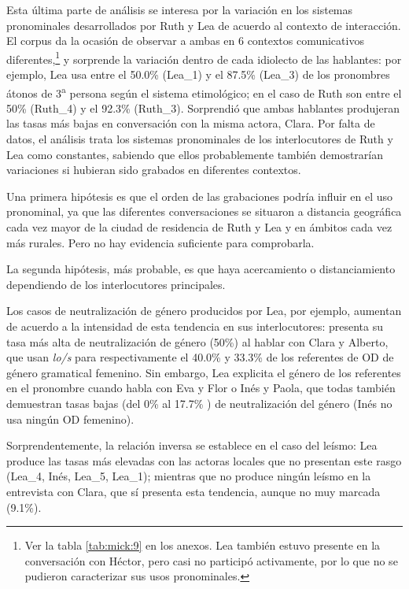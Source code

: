 \documentclass[output=paper]{../langscibook}
\begin{document}
Esta última parte de análisis se interesa por la variación en los sistemas pronominales desarrollados por Ruth y Lea de acuerdo al contexto de interacción. El corpus da la ocasión de observar a ambas en 6 contextos comunicativos diferentes,\footnote{Ver la tabla \ref{tab:mick:9} en los anexos. Lea también estuvo presente en la conversación con Héctor, pero casi no participó activamente, por lo que no se pudieron caracterizar sus usos pronominales.} y sorprende la variación dentro de cada idiolecto de las hablantes: por ejemplo, Lea usa entre el 50.0\% (Lea\_1) y el 87.5\% (Lea\_3) de los pronombres átonos de 3\textsuperscript{a} persona según el sistema etimológico; en el caso de Ruth son entre el 50\% (Ruth\_4) y el 92.3\% (Ruth\_3). Sorprendió que ambas hablantes produjeran las tasas más bajas en conversación con la misma actora, Clara. Por falta de datos, el análisis trata los sistemas pronominales de los interlocutores de Ruth y Lea como constantes, sabiendo que ellos probablemente también demostrarían variaciones si hubieran sido grabados en diferentes contextos.

Una primera hipótesis es que el orden de las grabaciones podría influir en el uso pronominal, ya que las diferentes conversaciones se situaron a distancia geográfica cada vez mayor de la ciudad de residencia de Ruth y Lea y en ámbitos cada vez más rurales. Pero no hay evidencia suficiente para comprobarla. 

La segunda hipótesis, más probable, es que haya acercamiento o distanciamiento dependiendo de los interlocutores principales.

Los casos de neutralización de género producidos por Lea, por ejemplo, aumentan de acuerdo a la intensidad de esta tendencia en sus interlocutores: presenta su tasa más alta de neutralización de género (50\%) al hablar con Clara y Alberto, que usan \textit{lo/s} para respectivamente el 40.0\% y 33.3\% de los referentes de OD de género gramatical femenino. Sin embargo, Lea explicita el género de los referentes en el pronombre cuando habla con Eva y Flor o Inés y Paola, que todas también demuestran tasas bajas (del 0\% al 17.7\% ) de neutralización del género (Inés no usa ningún OD femenino). 

Sorprendentemente, la relación inversa se establece en el caso del leísmo: Lea produce las tasas más elevadas con las actoras locales que no presentan este rasgo (Lea\_4, Inés, Lea\_5, Lea\_1); mientras que no produce ningún leísmo en la entrevista con Clara, que sí presenta esta tendencia, aunque no muy marcada (9.1\%). 
\end{document}
